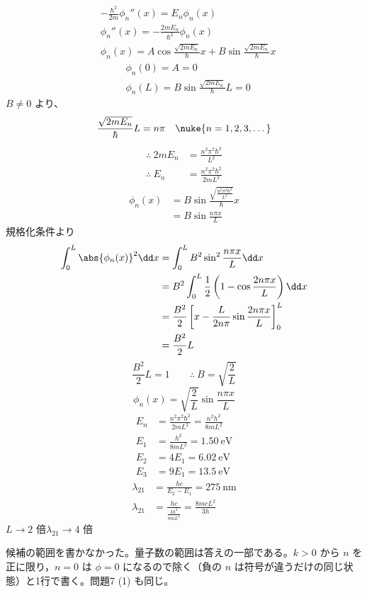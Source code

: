 \begin{align*}
&-\frac{\hbar^{2}}{2m}\phi_{n}''(x)=E_{n}\phi_{n}(x)\\
&\phi_{n}''(x)=-\frac{2mE_{n}}{\hbar^{2}}\phi_{n}(x)\\
&\phi_{n}(x)=A\cos\frac{\sqrt{2mE_{n}}}{\hbar}x+B\sin\frac{\sqrt{2mE_{n}}}{\hbar}x
\end{align*}
\begin{align*}
&\phi_{n}(0)=A=0\\
&\phi_{n}(L)=B\sin\frac{\sqrt{2mE_{n}}}{\hbar}L=0
\end{align*}
$B\neq0$ より、
\[ \frac{\sqrt{2mE_{n}}}{\hbar}L=n\pi\quad\nuke{n=1,2,3,\dots} \]
\begin{align*}
\therefore\ 2mE_{n}&=\frac{n^{2}\pi^{2}\hbar^{2}}{L^{2}}\\
\therefore\ E_{n}&=\frac{n^{2}\pi^{2}\hbar^{2}}{2mL^{2}}
\end{align*}
\begin{align*}
\phi_{n}(x)&=B\sin\frac{\sqrt{\frac{n^{2}\pi^{2}\hbar^{2}}{L^{2}}}}{\hbar}x\\
&=B\sin\frac{n\pi x}{L}
\end{align*}
規格化条件より
\begin{align*}
\int_{0}^{L}\abs{\phi_{n}(x)}^{2}\dd x&=\int_{0}^{L}B^{2}\sin^{2}\frac{n\pi x}{L}\dd x\\
&=B^{2}\int_{0}^{L}\frac{1}{2}\left(1-\cos\frac{2n\pi x}{L}\right)\dd x\\
&=\frac{B^{2}}{2}\left[x-\frac{L}{2n\pi}\sin\frac{2n\pi x}{L}\right]_{0}^{L}\\
&=\frac{B^{2}}{2}L
\end{align*}
\[ \frac{B^{2}}{2}L=1\qquad\therefore\ B=\sqrt{\frac{2}{L}} \]
\[ \phi_{n}(x)=\sqrt{\frac{2}{L}}\sin\frac{n\pi x}{L} \]
\begin{align*}
E_{n}&=\frac{n^{2}\pi^{2}\hbar^{2}}{2mL^{2}}=\frac{n^{2}h^{2}}{8mL^{2}}\\
E_{1}&=\frac{h^{2}}{8mL^{2}}=\qty{1.50}{\electronvolt}\\
E_{2}&=4E_{1}=\qty{6.02}{\electronvolt}\\
E_{3}&=9E_{1}=\qty{13.5}{\electronvolt}
\end{align*}
\begin{align*}
\lambda_{21}&=\frac{hc}{E_{2}-E_{1}}=\qty{275}{\nano\metre}\\
\lambda_{21}&=\frac{hc}{\frac{3h^{2}}{8mL^{2}}}=\frac{8mcL^{2}}{3h}
\end{align*}
$L\to2$ 倍\qquad $\lambda_{21}\to4$ 倍
\item {} 候補の範囲を書かなかった。量子数の範囲は答えの一部である。$k>0$ から $n$ を正に限り，$n=0$ は $\phi=0$ になるので除く（負の $n$ は符号が違うだけの同じ状態）と1行で書く。問題7 (1) も同じ。
